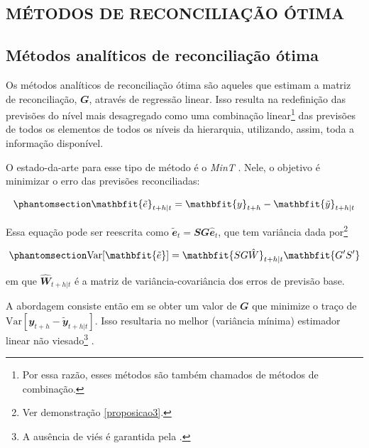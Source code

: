 \postextual

\begin{apendicesenv}
\partapendices

\chapter{MÉTODOS DE RECONCILIAÇÃO ÓTIMA}\label{apendice_metodos_reconciliacao}

\section{Métodos analíticos de reconciliação
ótima}\label{muxe9todos-analuxedticos-de-reconciliauxe7uxe3o-uxf3tima}

Os métodos analíticos de reconciliação ótima são aqueles que estimam a
matriz de reconciliação, \(\mathbfit{G}\), através de regressão linear.
Isso resulta na redefinição das previsões do nível mais desagregado como
uma combinação linear\footnote{Por essa razão, esses métodos são também
  chamados de métodos de combinação.} das previsões de todos os
elementos de todos os níveis da hierarquia, utilizando, assim, toda a
informação disponível.

O estado-da-arte para esse tipo de método é o \emph{MinT}
\autocite{wickramasuriya_optimal_2019}. Nele, o objetivo é minimizar o
erro das previsões reconciliadas:

\begin{equation}\phantomsection\label{eq-mint1}{
\mathbfit{\tilde{e}}_{t+h|t} = \mathbfit{y}_{t+h} - \mathbfit{\tilde{y}}_{t+h|t}
}\end{equation}

Essa equação pode ser reescrita como
\(\mathbfit{\tilde{e}}_t = \mathbfit{SG\hat{e}}_t\), que tem variância
dada por\footnote{Ver demonstração \ref{proposicao3}.}

\begin{equation}\phantomsection\label{eq-mint2}{
\text{Var}[\mathbfit{\tilde{e}}] = \mathbfit{SG\hat{W}}_{t+h|t}\mathbfit{G'S'}
}\end{equation}

\noindent em que \(\mathbfit{\hat{W}}_{t+h|t}\) é a matriz de
variância-covariância dos erros de previsão base.

A abordagem consiste então em se obter um valor de \(\mathbfit{G}\) que
minimize o traço de
\(\text{Var}[\mathbfit{y}_{t+h} - \mathbfit{\tilde{y}}_{t+h|t}]\). Isso
resultaria no melhor (variância mínima) estimador linear não
viesado\footnote{A ausência de viés é garantida pela
  .} \autocite{wickramasuriya_optimal_2019}.


\end{apendicesenv}
